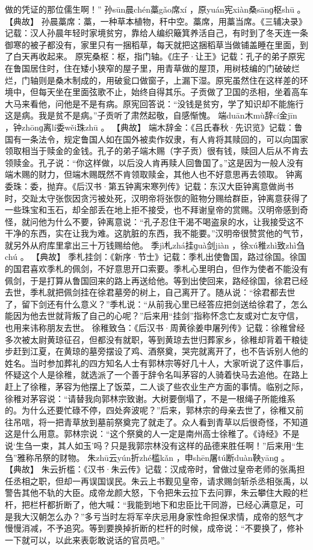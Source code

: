 \documentclass[12pt,UTF8]{ctexbook}
\begin{document}
做的凭证的那位儒生啊！”
孙sūn晨chén藁gǎo席xí
，原yuán宪xiàn桑sānɡ枢shū
。
【典故】
孙晨藁席：藁，一种草本植物，秆中空。藁席，用藁当席。《三辅决录》记载：汉人孙晨年轻时家境贫穷，靠给人编织簸箕养活自己，有时到了冬天连一条御寒的被子都没有，家里只有一捆稻草，每天就把这捆稻草当做铺盖睡在里面，到了白天再收起来。
原宪桑枢：枢，指门轴。《庄子·让王》记载：孔子的弟子原宪在鲁国居住时，住在矮小狭窄的屋子里，用青草做的屋顶，用树枝编的门破破烂烂，门轴则是桑木制成的，用破瓮口做窗子，上漏下湿。原宪虽然住在这样差的环境中，但每天坐在里面弦歌不止，始终自得其乐。子贡做了卫国的丞相，坐着高车大马来看他，问他是不是有病。原宪回答说：“没钱是贫穷，学了知识却不能施行这是病。我是贫不是病。”子贡听了肃然起敬，自感惭愧。
端duān木mù辞cí金jīn
，钟zhōnɡ离lí委wěi珠zhū
。
【典故】
端木辞金：《吕氏春秋·先识览》记载：鲁国有一条法令，规定鲁国人如在国外被卖作奴隶，有人肯将其赎回的，可以向国家领取相当于赎金的金钱。孔子的弟子端木赐（字子贡）很有钱，赎回人后从不肯去领赎金。孔子说：“你这样做，以后没人肯再赎人回鲁国了。”这是因为一般人没有端木赐的财力，但端木赐既然不肯领取赎金，其他人也不好意思再去领取。
钟离委珠：委，抛弃。《后汉书·第五钟离宋寒列传》记载：东汉大臣钟离意做尚书时，交趾太守张恢因贪污被处死，汉明帝将张恢的赃物分赐给群臣，钟离意获得了一些珠宝和玉石，却全部丢在地上拒不接受，也不拜谢皇帝的赏赐。汉明帝感到奇怪，就问他为什么不要，钟离意说：“孔子忍住干渴不喝盗泉的水，让我接受这不干净的东西，实在让我为难。这肮脏的东西，我不能要。”汉明帝很赞赏他的气节，就另外从府库里拿出三十万钱赐给他。
季jì札zhá挂ɡuà剑jiàn
，徐xú稚zhì致zhì刍chú
。
【典故】
季札挂剑：《新序·节士》记载：季札出使鲁国，路过徐国。徐国的国君喜欢季札的佩剑，不好意思开口索要。季札心里明白，但作为使者不能没有佩剑，于是打算从鲁国回来的路上再送给他。等到出使回来，路经徐国，徐君已经去世，季札就把佩剑挂在徐君墓旁的树上，自己离开了。随从说：“徐君都去世了，留下剑还有什么意义？”季札说：“从前我心里已经答应把剑送给徐君了，怎么能因为他去世就背叛了自己的心呢？”后来用“挂剑”指称怀念亡友或对亡友守信，也用来讳称朋友去世。
徐稚致刍：《后汉书·周黄徐姜申屠列传》记载：徐稚曾经多次被太尉黄琼征召，但都没有就职，等到黄琼去世归葬家乡，徐稚却背着干粮徒步赶到江夏，在黄琼的墓旁摆设了鸡、酒祭奠，哭完就离开了，也不告诉别人他的姓名。当时参加葬礼的四方知名人士有郭林宗等好几十人，大家听说了这件事后，怀疑这个人是徐稚，就选派了一个善于辞令名叫茅容的人骑着快马去追他。在路上赶上了徐稚，茅容为他摆上了饭菜，二人谈了些农业生产方面的事情。临别之际，徐稚对茅容说：“请替我向郭林宗致谢。大树要倒塌了，不是一根绳子所能维系的。为什么还要忙碌不停，四处奔波呢？”后来，郭林宗的母亲去世了，徐稚又前往吊唁，将一把青草放到墓前祭奠完了就走了。众人看到青草以后很奇怪，不知道这是什么用意。郭林宗说：“这个祭奠的人一定是南州高士徐稚了。《诗经》不是说‘生刍一束，其人如玉’吗？只是我郭宗林没有这样的品德来胜任啊！”后来用“生刍”雅称吊祭的财物。
朱zhū云yún折zhé槛kǎn
，申shēn屠tú断duàn鞅yānɡ
。
【典故】
朱云折槛：《汉书·朱云传》记载：汉成帝时，曾做过皇帝老师的张禹担任丞相之职，但却一再误国误民。朱云上书觐见皇帝，请求赐剑斩杀丞相张禹，以警告其他不轨的大臣。成帝龙颜大怒，下令把朱云拉下去问罪，朱云攀住大殿的栏杆，把栏杆都折断了，他大喊：“我能到地下和忠臣比干同游，已经心满意足，可是我大汉朝怎么办？”多亏当时左将军辛庆忌用身家性命担保求情，成帝的怒气才慢慢消减，不予追究。等到要换掉折断的栏杆的时候，成帝说：“不要换了，修补一下就可以，以此来表彰敢说话的官员吧。”
\end{document}
